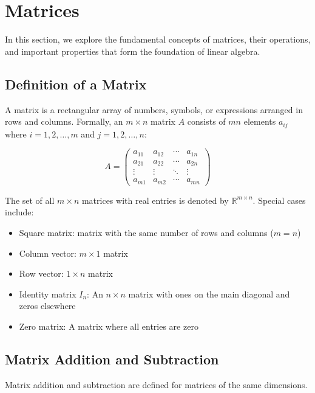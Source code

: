 \newpage
\section{Matrices}

In this section, we explore the fundamental concepts of matrices, their operations, and important properties that form the foundation of linear algebra.

\subsection{Definition of a Matrix}

A matrix is a rectangular array of numbers, symbols, or expressions arranged in rows and columns. Formally, an \(m \times n\) matrix \(A\) consists of \(mn\) elements \(a_{ij}\) where \(i = 1, 2, \ldots, m\) and \(j = 1, 2, \ldots, n\):

\begin{equation*}
A = 
\begin{pmatrix}
a_{11} & a_{12} & \cdots & a_{1n} \\
a_{21} & a_{22} & \cdots & a_{2n} \\
\vdots & \vdots & \ddots & \vdots \\
a_{m1} & a_{m2} & \cdots & a_{mn}
\end{pmatrix}
\end{equation*}

The set of all \(m \times n\) matrices with real entries is denoted by \(\mathbb{R}^{m \times n}\). Special cases include:
\begin{itemize}[label=\(-\)]
    \item Square matrix: matrix with the same number of rows and columns (\(m = n\))
    \item Column vector: \(m \times 1\) matrix
    \item Row vector: \(1 \times n\) matrix
    \item Identity matrix \(I_n\): An \(n \times n\) matrix with ones on the main diagonal and zeros elsewhere
    \item Zero matrix: A matrix where all entries are zero
\end{itemize}

\subsection{Matrix Addition and Subtraction}

Matrix addition and subtraction are defined for matrices of the same dimensions.

